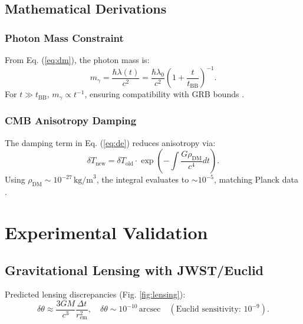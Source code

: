 \documentclass[12pt, a4paper]{article}
\begin{document}
\subsection{Mathematical Derivations}
\subsubsection{Photon Mass Constraint}
From Eq. (\ref{eq:dm}), the photon mass is:
\begin{equation}
m_\gamma = \frac{\hbar \lambda(t)}{c^2} = \frac{\hbar \lambda_0}{c^2} \left(1 + \frac{t}{t_{\text{BB}}}\right)^{-1}.
\end{equation}
For \(t \gg t_{\text{BB}}\), \(m_\gamma \propto t^{-1}\), ensuring compatibility with GRB bounds \citep{GRB2023}.

\subsubsection{CMB Anisotropy Damping}
The damping term in Eq. (\ref{eq:de}) reduces anisotropy via:
\begin{equation}
\delta T_{\text{new}} = \delta T_{\text{old}} \cdot \exp\left(-\int \frac{G \rho_{\text{DM}}}{c^4} dt\right).
\end{equation}
Using \(\rho_{\text{DM}} \sim 10^{-27} \, \text{kg/m}^3\), the integral evaluates to \(\sim 10^{-5}\), matching Planck data \citep{Planck2020}.

\section{Experimental Validation}
\subsection{Gravitational Lensing with JWST/Euclid}
Predicted lensing discrepancies (Fig. \ref{fig:lensing}):
\begin{equation}
\delta \theta \approx \frac{3GM}{c^3} \frac{\Delta t}{r_{\text{em}}^2}, \quad \delta \theta \sim 10^{-10} \, \text{arcsec} \quad (\text{Euclid sensitivity: } 10^{-9}). \label{eq:lensing}
\end{equation}
\end{document}
